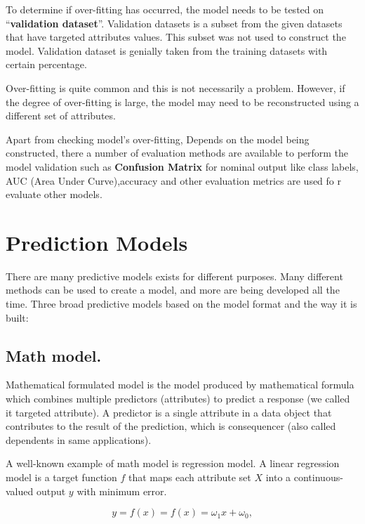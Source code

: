 \documentclass[
]{book}
\begin{document}
To determine if over-fitting has occurred, the model needs to be tested on ``\textbf{validation dataset}''. Validation datasets is a subset from the given datasets that have targeted attributes values. This subset was not used to construct the model. Validation dataset is genially taken from the training datasets with certain percentage.

Over-fitting is quite common and this is not necessarily a problem. However, if the degree of over-fitting is large, the model may need to be reconstructed using a different set of attributes.

Apart from checking model's over-fitting, Depends on the model being constructed, there a number of evaluation methods are available to perform the model validation such as \textbf{Confusion Matrix} for nominal output like class labels, AUC (Area Under Curve),accuracy and other evaluation metrics are used fo r evaluate other models.

\hypertarget{prediction-models}{%
\section{Prediction Models}\label{prediction-models}}

There are many predictive models exists for different purposes. Many different methods can be used to create a model, and more are being developed all the time. Three broad predictive models based on the model format and the way it is built:

\hypertarget{math-model.}{%
\subsection{Math model.}\label{math-model.}}

Mathematical formulated model is the model produced by mathematical formula which combines multiple predictors (attributes) to predict a response (we called it targeted attribute). A predictor is a single attribute in a data object that contributes to the result of the prediction, which is consequencer (also called dependents in same applications).

A well-known example of math model is regression model. A linear regression model is a target function \(f\) that maps each attribute set \(X\) into a continuous-valued output \(y\) with minimum error.

\begin{equation} 
  y = f(x) = f(x)= ω_1 x+ω_0,
  \label{eq:binom}
\end{equation}
\end{document}

